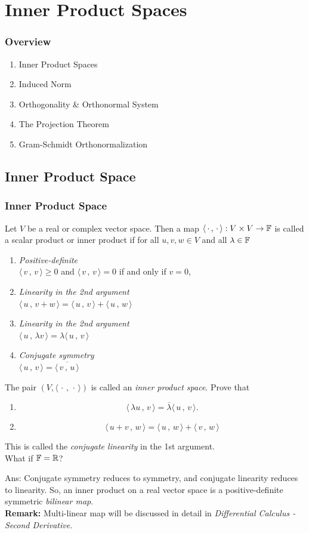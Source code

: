 \documentclass{beamer}
\renewcommand{\emph}[1]{{\color{Turquoise3}\textsl{#1}}}
\newcommand{\nullspace}{~\\[15pt]}
\newcommand{\remark}{\textbf{Remark: }}
\newcommand{\scp}[2]{\langle\,#1\,,\,#2\,\rangle} \newcommand{\scpp}{\langle\,\cdot\,,\,\cdot\,\rangle}
\begin{document}
\section{Inner Product Spaces}
\begin{frame}
    \frametitle{Overview}
    \begin{enumerate}
        \item Inner Product Spaces
        \item Induced Norm
        \item Orthogonality \& Orthonormal System
        \item The Projection Theorem
        \item Gram-Schmidt Orthonormalization
    \end{enumerate}

\end{frame}

\subsection{Inner Product Space}
\begin{frame}[allowframebreaks]
    \frametitle{Inner Product Space}
    Let $V$ be a real or complex vector space. Then a map $\langle\,\cdot\,,\,\cdot\,\rangle: V\times V\rightarrow\mathbb{F}$ is called a scalar product or inner product if for all $u,v,w\in V$ and all $\lambda\in\mathbb{F}$
    \begin{enumerate}
        \item \textit{Positive-definite}\\ $\scp{v}{v}\geq0$ and $\scp{v}{v}=0$ if and only if $v=0$,
        \item \textit{Linearity in the 2nd argument}\\ $\scp{u}{v+w}=\scp{u}{v}+\scp{u}{w}$
        \item \textit{Linearity in the 2nd argument}\\ $\scp{u}{\lambda v}=\lambda\scp{u}{v}$
        \item \textit{Conjugate symmetry}\\ $\scp{u}{v}=\overline{\scp{v}{u}}$
    \end{enumerate}
    The pair $(V,\scpp)$ is called an \emph{inner product space}.
    \newpage
    Prove that
    \begin{enumerate}
        \item \[\scp{\lambda u}{v}=\overline{\lambda}\scp{u}{v}.\]
        \item \[\scp{u+v}{w}=\scp{u}{w}+\scp{v}{w}\]
    \end{enumerate}
    This is called the \emph{conjugate linearity} in the 1st argument.
    \nullspace
    What if $\mathbb{F}=\mathbb{R}$?

    Ans: Conjugate symmetry reduces to symmetry, and conjugate linearity reduces to linearity. So, an inner product on a real vector space is a positive-definite symmetric \emph{bilinear map}.
    \nullspace
    \remark  Multi-linear map will be discussed in detail in \textsl{Differential Calculus - Second Derivative}.
\end{frame}
\end{document}
